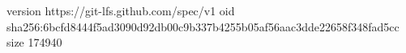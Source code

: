 version https://git-lfs.github.com/spec/v1
oid sha256:6bcfd8444f5ad3090d92db00c9b337b4255b05af56aac3dde22658f348fad5cc
size 174940
